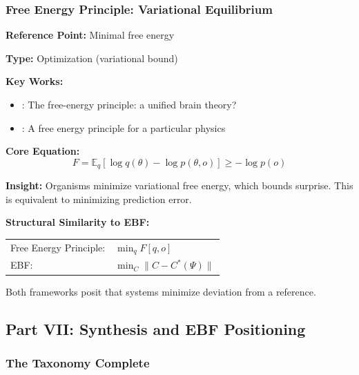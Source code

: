 \subsubsection{Free Energy Principle: Variational Equilibrium}

\begin{tcolorbox}[colback=gray!5!white, colframe=gray!75!black]
\textbf{Reference Point:} Minimal free energy

\textbf{Type:} Optimization (variational bound)

\textbf{Key Works:}
\begin{itemize}[nosep]
    \item \citet{friston2010}: The free-energy principle: a unified brain theory?
    \item \citet{friston2019}: A free energy principle for a particular physics
\end{itemize}

\textbf{Core Equation:}
\begin{equation}
F = \mathbb{E}_q[\log q(\theta) - \log p(\theta, o)] \geq -\log p(o)
\end{equation}

\textbf{Insight:}
Organisms minimize variational free energy, which bounds surprise.
This is equivalent to minimizing prediction error.

\textbf{Structural Similarity to EBF:}
\begin{center}
\begin{tabular}{ll}
Free Energy Principle: & $\min_q F[q, o]$ \\
EBF: & $\min_C \|C - C^*(\Psi)\|$
\end{tabular}
\end{center}

Both frameworks posit that systems minimize deviation from a reference.
\end{tcolorbox}



\subsection{Part VII: Synthesis and EBF Positioning}
\label{sec:AY-synthesis}

\subsubsection{The Taxonomy Complete}

